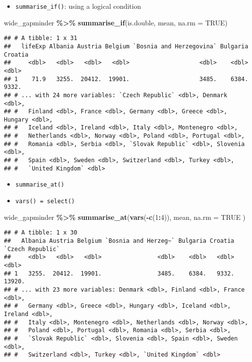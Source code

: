 \documentclass[
]{book}
\newenvironment{Shaded}{\begin{snugshade}}{\end{snugshade}}
\newcommand{\DataTypeTok}[1]{\textcolor[rgb]{0.13,0.29,0.53}{#1}}
\newcommand{\DecValTok}[1]{\textcolor[rgb]{0.00,0.00,0.81}{#1}}
\newcommand{\KeywordTok}[1]{\textcolor[rgb]{0.13,0.29,0.53}{\textbf{#1}}}
\newcommand{\NormalTok}[1]{#1}
\newcommand{\OperatorTok}[1]{\textcolor[rgb]{0.81,0.36,0.00}{\textbf{#1}}}
\newcommand{\OtherTok}[1]{\textcolor[rgb]{0.56,0.35,0.01}{#1}}
\newcommand{\StringTok}[1]{\textcolor[rgb]{0.31,0.60,0.02}{#1}}
\providecommand{\tightlist}{%
  \setlength{\itemsep}{0pt}\setlength{\parskip}{0pt}}
\begin{document}
\begin{itemize}
\tightlist
\item
  \texttt{summarise\_if()}: using a logical condition
\end{itemize}

\begin{Shaded}
\begin{Highlighting}[]
\NormalTok{wide\_gapminder }\OperatorTok{\%\textgreater{}\%}
\StringTok{  }\KeywordTok{summarise\_if}\NormalTok{(is.double, mean, }\DataTypeTok{na.rm =} \OtherTok{TRUE}\NormalTok{)}
\end{Highlighting}
\end{Shaded}

\begin{verbatim}
## # A tibble: 1 x 31
##   lifeExp Albania Austria Belgium `Bosnia and Herzegovina` Bulgaria Croatia
##     <dbl>   <dbl>   <dbl>   <dbl>                    <dbl>    <dbl>   <dbl>
## 1    71.9   3255.  20412.  19901.                    3485.    6384.   9332.
## # ... with 24 more variables: `Czech Republic` <dbl>, Denmark <dbl>,
## #   Finland <dbl>, France <dbl>, Germany <dbl>, Greece <dbl>, Hungary <dbl>,
## #   Iceland <dbl>, Ireland <dbl>, Italy <dbl>, Montenegro <dbl>,
## #   Netherlands <dbl>, Norway <dbl>, Poland <dbl>, Portugal <dbl>,
## #   Romania <dbl>, Serbia <dbl>, `Slovak Republic` <dbl>, Slovenia <dbl>,
## #   Spain <dbl>, Sweden <dbl>, Switzerland <dbl>, Turkey <dbl>,
## #   `United Kingdom` <dbl>
\end{verbatim}

\begin{itemize}
\item
  \texttt{summarise\_at()}
\item
  \texttt{vars()\ =\ select()}
\end{itemize}

\begin{Shaded}
\begin{Highlighting}[]
\NormalTok{wide\_gapminder }\OperatorTok{\%\textgreater{}\%}
\StringTok{  }\KeywordTok{summarise\_at}\NormalTok{(}\KeywordTok{vars}\NormalTok{(}\OperatorTok{{-}}\KeywordTok{c}\NormalTok{(}\DecValTok{1}\OperatorTok{:}\DecValTok{4}\NormalTok{)),}
\NormalTok{    mean,}
    \DataTypeTok{na.rm =} \OtherTok{TRUE}
\NormalTok{  )}
\end{Highlighting}
\end{Shaded}

\begin{verbatim}
## # A tibble: 1 x 30
##   Albania Austria Belgium `Bosnia and Herzeg~` Bulgaria Croatia `Czech Republic`
##     <dbl>   <dbl>   <dbl>                <dbl>    <dbl>   <dbl>            <dbl>
## 1   3255.  20412.  19901.                3485.    6384.   9332.           13920.
## # ... with 23 more variables: Denmark <dbl>, Finland <dbl>, France <dbl>,
## #   Germany <dbl>, Greece <dbl>, Hungary <dbl>, Iceland <dbl>, Ireland <dbl>,
## #   Italy <dbl>, Montenegro <dbl>, Netherlands <dbl>, Norway <dbl>,
## #   Poland <dbl>, Portugal <dbl>, Romania <dbl>, Serbia <dbl>,
## #   `Slovak Republic` <dbl>, Slovenia <dbl>, Spain <dbl>, Sweden <dbl>,
## #   Switzerland <dbl>, Turkey <dbl>, `United Kingdom` <dbl>
\end{verbatim}
\end{document}
